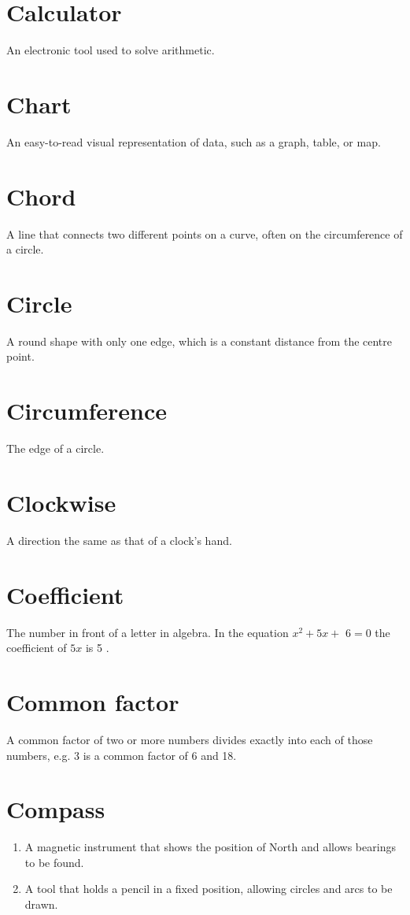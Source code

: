 \documentclass[10pt]{article}
\begin{document}
\section*{Calculator}
An electronic tool used to solve arithmetic.

\section*{Chart}
An easy-to-read visual representation of data, such as a graph, table, or map.

\section*{Chord}
A line that connects two different points on a curve, often on the circumference of a circle.

\section*{Circle}
A round shape with only one edge, which is a constant distance from the centre point.

\section*{Circumference}
The edge of a circle.

\section*{Clockwise}
A direction the same as that of a clock's hand.

\section*{Coefficient}
The number in front of a letter in algebra. In the equation $x^{2}+5 x+$ $6=0$ the coefficient of $5 x$ is 5 .

\section*{Common factor}
A common factor of two or more numbers divides exactly into each of those numbers, e.g. 3 is a common factor of 6 and 18.

\section*{Compass}
\begin{enumerate}
  \item A magnetic instrument that shows the position of North and allows bearings to be found.
  \item A tool that holds a pencil in a fixed position, allowing circles and arcs to be drawn.
\end{enumerate}
\end{document}
